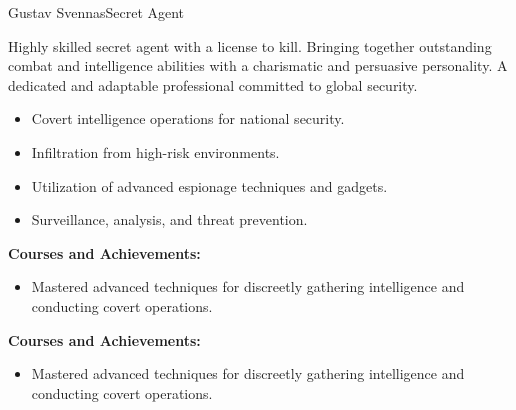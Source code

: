 \documentclass{article}
\begin{document}
\begin{cv}[avatar]{Gustav Svennas}{Secret Agent}



Highly skilled secret agent with a license to kill. 
Bringing together outstanding combat and intelligence abilities with a charismatic and persuasive personality. 
A dedicated and adaptable professional committed to global security.



\begin{cvevent}[1962][present]
    \begin{itemize}
        \item Covert intelligence operations for national security.
        \item Infiltration from high-risk environments.
        \item Utilization of advanced espionage techniques and gadgets.
        \item Surveillance, analysis, and threat prevention.
    \end{itemize}
\end{cvevent}



\begin{cvevent}[2018][2023]
    \textbf{Courses and Achievements:}
    \begin{itemize}
        \item Mastered advanced techniques for discreetly gathering intelligence and conducting covert operations.
    \end{itemize}
\end{cvevent}

\begin{cvevent}[2012][2015]
    \textbf{Courses and Achievements:}
    \begin{itemize}
        \item Mastered advanced techniques for discreetly gathering intelligence and conducting covert operations.
    \end{itemize}
\end{cvevent}



\end{cv}
\end{document}
